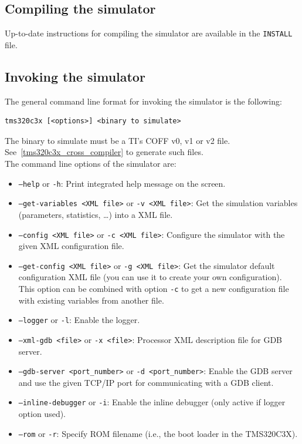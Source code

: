 \subsection{Compiling the simulator}

Up-to-date instructions for compiling the simulator are available in the \texttt{INSTALL} file.

\subsection{Invoking the simulator}

The general command line format for invoking the simulator is the following:

\begin{verbatim}
tms320c3x [<options>] <binary to simulate>
\end{verbatim}

\noindent The binary to simulate must be a TI's COFF v0, v1 or v2 file. See~\ref{tms320c3x_cross_compiler} to generate such files.
\newline\\
\noindent The command line options of the simulator are:

\begin{itemize}
\item \texttt{--help} or \texttt{-h}: Print integrated help message on the screen.
\item \texttt{--get-variables <XML file>} or \texttt{-v <XML file>}: Get the simulation variables (parameters, statistics, \ldots) into a XML file.
\item \texttt{--config <XML file>} or \texttt{-c <XML file>}: Configure the simulator with the given XML configuration file.
\item \texttt{--get-config <XML file>} or \texttt{-g <XML file>}: Get the simulator default configuration XML file (you can use it to create your own configuration). This option can be combined with option \texttt{-c} to get a new configuration file with existing variables from another file.
\item \texttt{--logger} or \texttt{-l}: Enable the logger.
\item \texttt{--xml-gdb <file>} or \texttt{-x <file>}: Processor XML description file for GDB server.
\item \texttt{--gdb-server <port\_number>} or \texttt{-d <port\_number>}: Enable the GDB server and use the given TCP/IP port for communicating with a GDB client.
\item \texttt{--inline-debugger} or \texttt{-i}: Enable the inline debugger (only active if logger option used).
\item \texttt{--rom} or \texttt{-r}: Specify ROM filename (i.e., the boot loader in the TMS320C3X).
\end{itemize}

